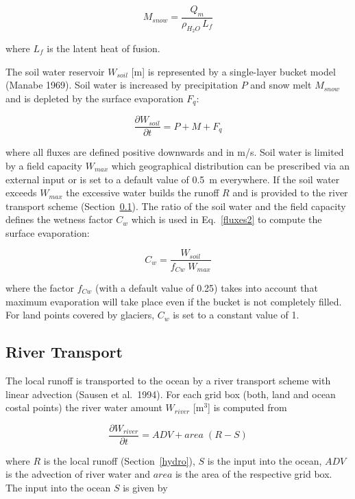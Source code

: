 \begin{equation}
M_{snow}=\frac{Q_m}{\rho_{H_2O}\, L_f}
\end{equation}

where $L_f$ is the latent heat of fusion.

The soil water reservoir $W_{soil}$ [m]  is
represented by a single-layer bucket model
(Manabe 1969). Soil water is increased by precipitation
$P$ and snow melt $M_{snow}$ 
and is depleted by the surface evaporation $F_q$:
 
\begin{equation}
\frac{\partial W_{soil}}{\partial t} = P + M + F_q
\end{equation}

where all fluxes are defined positive downwards and in
m/s.
Soil water is limited by a  field capacity $W_{max}$ 
which geographical distribution can be prescribed via an external input or is set to a default
value of
0.5~m everywhere. If the soil water
exceeds  $W_{max}$ the excessive
water builds the runoff $R$ and is provided to the river
transport scheme
(Section~\ref{runoff}). The ratio of the soil water and
the field capacity defines the wetness
factor $C_w$ which is used in Eq.~\ref{fluxes2} to
compute the surface evaporation:

\begin{equation}\label{cwgl}
C_w=\frac{W_{soil}}{f_{Cw} \; W_{max}}
\end{equation}

where the factor $f_{Cw}$ (with a default value of 0.25) takes into account that maximum
evaporation will take place even if the bucket is not completely filled. For land points covered
by glaciers, $C_w$ is set to a
constant value of 1. 

\subsection{River Transport}\label{runoff}

The local runoff is transported to the ocean by a river
transport scheme with linear advection 
(Sausen et al.~1994). For each grid box (both, land and
ocean costal points) the river water
amount $W_{river}$ [m$^3$] is computed from  

\begin{equation}
\frac{\partial W_{river}}{\partial t}= ADV + area \; (R - S) 
\end{equation}

where $R$ is the local runoff (Section~\ref{hydro}),
$S$ is the input into the ocean, $ADV$
is the advection of river water and $area$ is the area of the
respective grid box. The input into
the ocean $S$ is given by 

